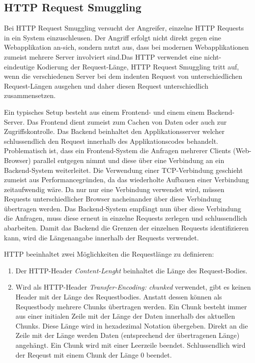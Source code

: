 \subsection{HTTP Request Smuggling}

Bei HTTP Request Smuggling versucht der Angreifer, einzelne HTTP Requests in ein System einzuschleusen. Der Angriff erfolgt nicht direkt gegen eine Webapplikation an-sich, sondern nutzt aus, dass bei modernen Webapplikationen zumeist mehrere Server involviert sind.Das HTTP verwendet eine nicht-eindeutige Kodierung der Request-Länge, HTTP Request Smuggling tritt auf, wenn die verschiedenen Server bei dem indenten Request von unterschiedlichen Request-Längen ausgehen und daher diesen Request unterschiedlich zusammensetzen.

Ein typisches Setup besteht aus einem Frontend- und einem einem Backend-Server. Das Frontend dient zumeist zum Cachen von Daten oder auch zur Zugriffskontrolle. Das Backend beinhaltet den Applikationsserver welcher schlussendlich den Request innerhalb des Applikationscodes behandelt. Problematisch ist, dass ein Frontend-System die Anfragen mehrerer Clients (Web-Browser) parallel entgegen nimmt und diese über eine Verbindung an ein Backend-System weiterleitet. Die Verwendung einer TCP-Verbindung geschieht zumeist aus Performancegründen, da das wiederholte Aufbauen einer Verbindung zeitaufwendig wäre. Da nur nur eine Verbindung verwendet wird, müssen Requests unterschiedlicher Browser nacheinander über diese Verbindung übertragen werden. Das Backend-System empfängt nun über diese Verbindung die Anfragen, muss diese erneut in einzelne Requests zerlegen und schlussendlich abarbeiten. Damit das Backend die Grenzen der einzelnen Requests identifizieren kann, wird die Längenangabe innerhalb der Requests verwendet.


HTTP beeinhaltet zwei Möglichkeiten die Requestlänge zu definieren:

\begin{enumerate}
	\item Der HTTP-Header \textit{Content-Lenght} beinhaltet die Länge des Request-Bodies.
	\item Wird als HTTP-Header \textit{Transfer-Encoding: chunked} verwendet, gibt es keinen Header mit der Länge des Requestbodies. Anstatt dessen können als Requestbody mehrere Chunks übertragen werden. Ein Chunk besteht immer aus einer initialen Zeile mit der Länge der Daten innerhalb des aktuellen Chunks. Diese Länge wird in hexadezimal Notation übergeben. Direkt an die Zeile mit der Länge werden Daten (entsprechend der übertragenen Länge) angehängt. Ein Chunk wird mit einer Leerzeile beendet. Schlussendlich wird der Reqeust mit einem Chunk der Länge 0 beendet.
\end{enumerate}

